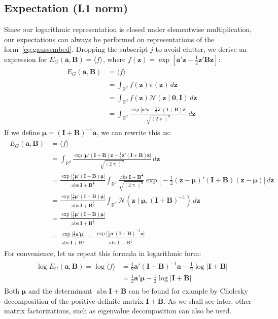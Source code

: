 \documentclass[a4paper,oneside,12pt,english]{report}
\def\zvec{\mathbf{z}}
\def\ND{\mathcal{N}}
\DeclareMathOperator{\abs}{abs}
\def\expv#1#2{\bigl\langle#1\bigr\rangle_{#2}}
\def\expp#1{\bigl\langle#1\bigr\rangle}
\def\R{\mathbb{R}}
\def\detm#1{\lvert#1\rvert}
\def\Bmat{\mathbf{B}}
\def\Imat{\mathbf{I}}
\def\muvec{\boldsymbol{\mu}}
\def\avec{\mathbf{a}}
\def\nulvec{\boldsymbol{0}}
\def\logdet#1{\log\detm{#1}}
\begin{document}
\subsection{Expectation (L1 norm)}
Since our logarithmic representation is closed under elementwise multiplication, our expectations can always be performed on representations of the form~\eqref{eq:gaussembed}. Dropping the subscript $j$ to avoid clutter, we derive an expression for $E_G(\avec,\Bmat)=\expv{f}{}$, where $f(\zvec)=\exp[\avec'\zvec-\frac12\zvec'\Bmat\zvec]$:
\begin{align}
\label{eq:MVGproblem}
\begin{split}
E_G(\avec,\Bmat) &= \expv{f}{} \\
&= \int_{\R^d} f(\zvec)\pi(\zvec) \,d\zvec \\
&= \int_{\R^d} f(\zvec)\ND(\zvec\mid\nulvec,\Imat) \,d\zvec \\
&= \int_{\R^d} \frac{\exp\bigl[\avec'\zvec -\frac12\zvec'(\Imat+\Bmat)\zvec\bigr]}{\sqrt{(2\uppi)^d}} \,d\zvec 
\end{split}
\end{align}
If we define $\muvec=(\Imat+\Bmat)^{-1}\avec$, we can rewrite this as:
\begin{align}
\label{eq:exactMVG}
\begin{split}
E_G(\avec,\Bmat) &= \expv{f}{} \\
&= \int_{\R^d} \frac{\exp\bigl[\muvec'(\Imat+\Bmat)\zvec -\frac12\zvec'(\Imat+\Bmat)\zvec\bigr]}{\sqrt{(2\uppi)^d}} \,d\zvec \\
&= \frac{\exp\bigl[\frac12\muvec'(\Imat+\Bmat)\muvec\bigr]}{\abs{\Imat+\Bmat}^{\frac12}}
\int_{\R^d} \frac{\abs{\Imat+\Bmat}^\frac12}{\sqrt{(2\uppi)^d}} \exp\bigl[-\frac12(\zvec-\muvec)'(\Imat+\Bmat)(\zvec-\muvec)\bigr]\,d\zvec \\
&= \frac{\exp\bigl[\frac12\muvec'(\Imat+\Bmat)\muvec\bigr]}{\abs{\Imat+\Bmat}^{\frac12}} \int_{\R^d} \ND(\zvec\mid\muvec,(\Imat+\Bmat)^{-1}) \,d\zvec \\
&= \frac{\exp\bigl[\frac12\muvec'(\Imat+\Bmat)\muvec\bigr]}{\abs{\Imat+\Bmat}^{\frac12}} \\
&= \frac{\exp\bigl[\frac12\avec'\muvec\bigr]}{\abs{\Imat+\Bmat}^{\frac12}} 
= \frac{\exp\bigl[\frac12\avec'(\Imat+\Bmat)^{-1}\avec\bigr]}{\abs{\Imat+\Bmat}^{\frac12}} 
\end{split}
\end{align}
For convenience, let us repeat this formula in logarithmic form:
\begin{align}
\label{eq:GMElogex}
\begin{split}
\log E_G(\avec,\Bmat) = \log\expp{f} 
&= \frac12\avec'(\Imat+\Bmat)^{-1}\avec - \frac12\logdet{\Imat+\Bmat} \\
&= \frac12\avec'\muvec - \frac12\logdet{\Imat+\Bmat}
\end{split}
\end{align}
Both $\muvec$ and the determinant $\abs{\Imat+\Bmat}$ can be found for example by Cholesky decomposition of the positive definite matrix $\Imat+\Bmat$. As we shall see later, other matrix factorizations, such as eigenvalue decomposition can also be used.  
\end{document}
